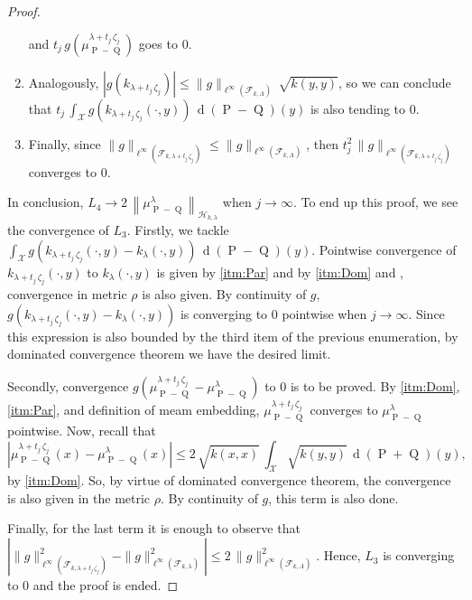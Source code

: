 \begin{proof}
\begin{enumerate}
\begin{equation}
					\end{equation}
					and $t_{j}\,g\left(\mu_{\operatorname{P}-\operatorname{Q}}^{\lambda+t_{j}\,\zeta_{j}}\right)$ goes to $0$.
					\item Analogously, $\left|g\left(k_{\lambda+t_{j}\,\zeta_{j}}\right)\right|\leq\|g\|_{\ell^{\infty}\left(\mathcal{F}_{k,\Lambda}\right)}\,\sqrt{k(y,y)}$, so we can conclude that $\displaystyle t_{j}\,\int_{\mathcal{X}}g\left(k_{\lambda+t_{j}\,\zeta_{j}}(\cdot,y)\right)\,\operatorname{d}(\operatorname{P}-\operatorname{Q})(y)$ is also tending to $0$.
					\item Finally, since $\|g\|_{\ell^{\infty}\left(\mathcal{F}_{k,\lambda+t_{j}\,\zeta_{j}}\right)}\leq\|g\|_{\ell^{\infty}\left(\mathcal{F}_{k,\Lambda}\right)}$, then $t_{j}^{2}\,\|g\|_{\ell^{\infty}\left(\mathcal{F}_{k,\lambda+t_{j}\,\zeta_{j}}\right)}$ converges to $0$.
				\end{enumerate}
				In conclusion, $L_{4}\longrightarrow2\,\left\|\mu_{\operatorname{P}-\operatorname{Q}}^{\lambda}\right\|_{\mathcal{H}_{k,\lambda}}$ when $j\longrightarrow\infty$. To end up this proof, we see the convergence of $L_{3}$. Firstly, we tackle $\displaystyle\int_{\mathcal{X}}g\left(k_{\lambda+t_{j}\,\zeta_{j}}(\cdot,y)-k_{\lambda}(\cdot,y)\right)\,\operatorname{d}(\operatorname{P}-\operatorname{Q})(y)$. Pointwise convergence of $k_{\lambda+t_{j}\,\zeta_{j}}(\cdot,y)$ to $k_{\lambda}(\cdot,y)$ is given by \ref{itm:Par} and by \ref{itm:Dom} and \textcite[Theorem 2.27]{Folland2013}, convergence in metric $\rho$ is also given. By continuity of $g$, $g\left(k_{\lambda+t_{j}\,\zeta_{j}}(\cdot,y)-k_{\lambda}(\cdot,y)\right)$ is converging to $0$ pointwise when $j\longrightarrow\infty$. Since this expression is also bounded by the third item of the previous enumeration, by dominated convergence theorem we have the desired limit.
				
				Secondly, convergence $g\left(\mu_{\operatorname{P}-\operatorname{Q}}^{\lambda+t_{j}\,\zeta_{j}}-\mu_{\operatorname{P}-\operatorname{Q}}^{\lambda}\right)$ to $0$ is to be proved. By \ref{itm:Dom}, \ref{itm:Par}, and definition of meam embedding, $\mu_{\operatorname{P}-\operatorname{Q}}^{\lambda+t_{j}\,\zeta_{j}}$ converges to $\mu_{\operatorname{P}-\operatorname{Q}}^{\lambda}$ pointwise. Now, recall that
				\begin{equation}
					\left|\mu_{\operatorname{P}-\operatorname{Q}}^{\lambda+t_{j}\,\zeta_{j}}(x)-\mu_{\operatorname{P}-\operatorname{Q}}^{\lambda}(x)\right|\leq2\,\sqrt{k(x,x)}\,\int_{\mathcal{X}}\sqrt{k(y,y)}\,\operatorname{d}(\operatorname{P}+\operatorname{Q})(y),
				\end{equation}
				by \ref{itm:Dom}. So, by virtue of dominated convergence theorem, the convergence is also given in the metric $\rho$. By continuity of $g$, this term is also done.
				
				Finally, for the last term it is enough to observe that $\left|\|g\|_{\ell^{\infty}\left(\mathcal{F}_{k,\lambda+t_{j}\,\zeta_{j}}\right)}^{2}-\|g\|_{\ell^{\infty}\left(\mathcal{F}_{k,\lambda}\right)}^{2}\right|\leq2\,\|g\|_{\ell^{\infty}\left(\mathcal{F}_{k,\Lambda}\right)}^{2}$. Hence, $L_{3}$ is converging to $0$ and the proof is ended.
			\end{proof}
